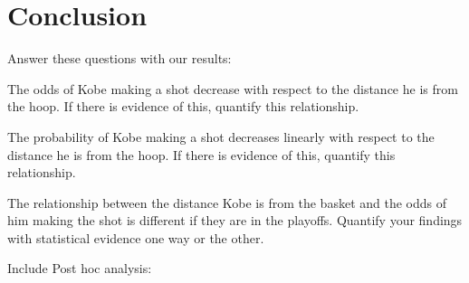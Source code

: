 \chapter{Conclusion}\label{chap:conclusion}



Answer these questions with our results:

The odds of Kobe making a shot decrease with respect to the distance he is from the hoop.  If there is evidence of this, quantify this relationship.

The probability of Kobe making a shot decreases linearly with respect to the distance he is from the hoop. If there is evidence of this, quantify this relationship.

The relationship between the distance Kobe is from the basket and the odds of him making the shot is different if they are in the playoffs. Quantify your findings with statistical evidence one way or the other.


Include Post hoc analysis:
